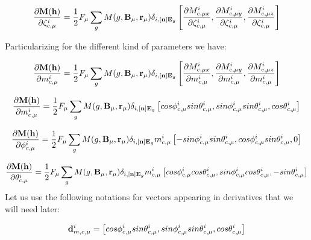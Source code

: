 \documentclass[10pt]{article}
\begin{document}
\begin{equation} \label{der_spher3}
\frac{\partial{\bf M}({\bf h})}{\partial \zeta_{c,\mu}^i}= \frac{1}{2} F_\mu \sum_g M(g,{\bf B}_\mu,{\bf r}_\mu) \delta_{i,{[{\bf n}]{\bf E}_g}}  \left[ \frac{\partial M_{c,\mu x}^{i}}{\partial \zeta_{c,\mu}^i} , \frac{\partial M_{c,\mu y}^{i}}{\partial \zeta_{c,\mu}^i},\frac{\partial M_{c,\mu z}^{i}}{\partial \zeta_{c,\mu}^i}  \right] 
\end{equation}

Particularizing for the different kind of parameters we have:

\begin{equation} \label{der_spher_mom}
\frac{\partial{\bf M}({\bf h})}{\partial m_{c,\mu}^i}= \frac{1}{2} F_\mu \sum_g M(g,{\bf B}_\mu,{\bf r}_\mu) \delta_{i,{[{\bf n}]{\bf E}_g}}  \left[ \frac{\partial M_{c,\mu x}^{i}}{\partial m_{c,\mu}^i} , \frac{\partial M_{c,\mu y}^{i}}{\partial m_{c,\mu}^i},\frac{\partial M_{c,\mu z}^{i}}{\partial m_{c,\mu}^i}  \right] 
\end{equation}

\begin{equation} \label{der_spher_mom2}
\frac{\partial{\bf M}({\bf h})}{\partial m_{c,\mu}^i}= \frac{1}{2} F_\mu \sum_g M(g,{\bf B}_\mu,{\bf r}_\mu) \delta_{i,{[{\bf n}]{\bf E}_g}}  \left[ cos\phi_{c,\mu}^i sin\theta_{c,\mu}^i , sin\phi_{c,\mu}^i sin\theta_{c,\mu}^i , cos\theta_{c,\mu}^i  \right]
\end{equation}

\begin{equation} \label{der_spher_phi}
\frac{\partial{\bf M}({\bf h})}{\partial \phi_{c,\mu}^i}= \frac{1}{2} F_\mu \sum_g M(g,{\bf B}_\mu,{\bf r}_\mu) \delta_{i,{[{\bf n}]{\bf E}_g}} m_{c,\mu}^i   \left[ -sin\phi_{c,\mu}^i sin\theta_{c,\mu}^i , cos\phi_{c,\mu}^i sin\theta_{c,\mu}^i , 0  \right] 
\end{equation}

\begin{equation} \label{der_spher_theta}
\frac{\partial{\bf M}({\bf h})}{\partial \theta_{c,\mu}^i}= \frac{1}{2} F_\mu \sum_g M(g,{\bf B}_\mu,{\bf r}_\mu) \delta_{i,{[{\bf n}]{\bf E}_g}} m_{c,\mu}^i   \left[ cos\phi_{c,\mu}^i cos\theta_{c,\mu}^i , sin\phi_{c,\mu}^i cos\theta_{c,\mu}^i , -sin\theta_{c,\mu}^i  \right] 
\end{equation}
Let us use the following notations for vectors appearing in derivatives that we will need later:

\begin{equation} 
 {\bf d}_{m,c,\mu}^i = \left[ cos\phi_{c,\mu}^i sin\theta_{c,\mu}^i , sin\phi_{c,\mu}^i sin\theta_{c,\mu}^i , cos\theta_{c,\mu}^i  \right]
\end{equation}
\end{document}
